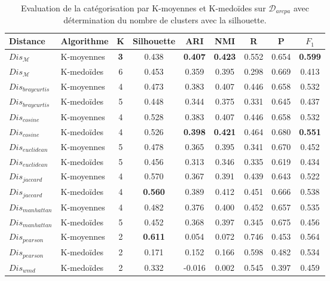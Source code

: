 \begin{table}[!htb]
	\centering \scriptsize
	\begin{tabular}[pos]{|l|l|c|c|c|c|c|c|c|}
		\hline
		\textbf{Distance}& \textbf{Algorithme}& \textbf{K}& \textbf{Silhouette}& \textbf{ARI} & \textbf{NMI} & \textbf{R} & \textbf{P} & \textbf{$F_1$} \\ \hline
		$Dis_\mathcal{M}$          & K-moyennes    & \textbf{3} & 0.438      & \textbf{0.407} & \textbf{0.423} & 0.552  & 0.654     & \textbf{0.599} \\ \hline
		$Dis_\mathcal{M}$          & K-medoïdes  & 6 & 0.453      & 0.359 & 0.395 & 0.298  & 0.669     & 0.413 \\ \hline
		$Dis_{braycurtis}$ & K-moyennes    & 4 & 0.473      & 0.383 & 0.407 & 0.446  & 0.658     & 0.532 \\ \hline
		$Dis_{braycurtis}$ & K-medoïdes  & 5 & 0.448      & 0.344 & 0.375 & 0.331  & 0.645     & 0.437 \\ \hline
		$Dis_{cosine}$     & K-moyennes    & 4 & 0.528      & 0.383 & 0.407 & 0.446  & 0.658     & 0.532 \\ \hline
		$Dis_{cosine}$     & K-medoïdes  & 4 & 0.526      & \textbf{0.398} & \textbf{0.421} & 0.464  & 0.680     & \textbf{0.551} \\ \hline
		$Dis_{euclidean}$  & K-moyennes    & 5 & 0.478      & 0.365 & 0.395 & 0.341  & 0.670     & 0.452 \\ \hline
		$Dis_{euclidean}$  & K-medoïdes  & 5 & 0.456      & 0.313 & 0.346 & 0.335  & 0.619     & 0.434 \\ \hline
		$Dis_{jaccard}$    & K-moyennes    & 4 & 0.570      & 0.367 & 0.391 & 0.439  & 0.643     & 0.522 \\ \hline
		$Dis_{jaccard}$    & K-medoïdes  & 4 & \textbf{0.560}      & 0.389 & 0.412 & 0.451  & 0.666     & 0.538 \\ \hline
		$Dis_{manhattan}$  & K-moyennes    & 4 & 0.482      & 0.376 & 0.400 & 0.452  & 0.657     & 0.535 \\ \hline
		$Dis_{manhattan}$  & K-medoïdes  & 5 & 0.452      & 0.368 & 0.397 & 0.345  & 0.675     & 0.456 \\ \hline
		$Dis_{pearson}$    & K-moyennes    & 2 & \textbf{0.611}      & 0.054 & 0.072 & 0.746  & 0.453     & 0.564 \\ \hline
		$Dis_{pearson}$    & K-medoïdes  & 2 & 0.171      & 0.152 & 0.166 & 0.598  & 0.482     & 0.534 \\ \hline
		$Dis_{wmd}$      & K-medoïdes  & 2 & 0.332      & -0.016 & 0.002 & 0.545  & 0.397     & 0.459 \\ \hline
	\end{tabular}
	\caption{Evaluation de la catégorisation par K-moyennes et K-medoïdes sur $\mathcal{D}_{arcpa}$ avec détermination du nombre de clusters avec la silhouette.} \label{tab:similarite:validation-supervisee-optKbySilhouette}
\end{table}


